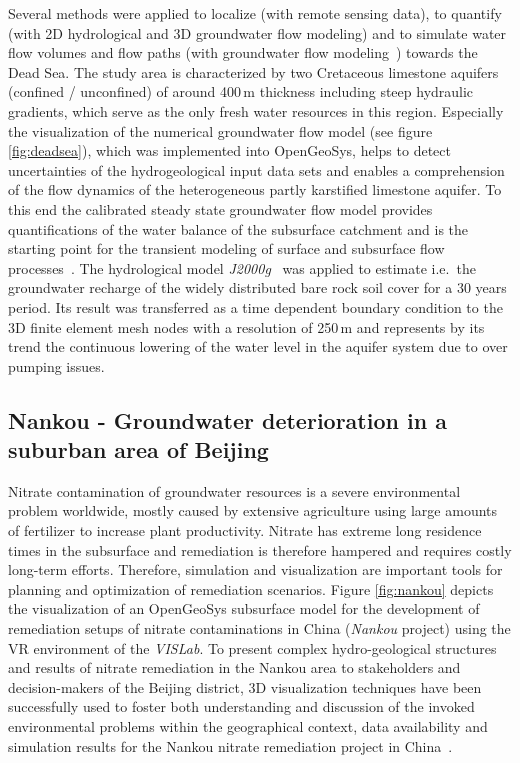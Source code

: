 \documentclass[twocolumn]{svjour3}          %
\begin{document}
Several methods were applied to localize (with remote sensing data), to quantify (with 2D hydrological and 3D groundwater flow modeling) and to simulate water flow volumes and flow paths (with groundwater flow modeling~\cite{graebe:modelcare}) towards the Dead Sea. The study area is characterized by two Cretaceous limestone aquifers (confined / unconfined) of around 400\,m thickness including steep hydraulic gradients, which serve as the only fresh water resources in this region. Especially the visualization of the numerical groundwater flow model (see figure \ref{fig:deadsea}), which was implemented into OpenGeoSys, helps to detect uncertainties of the hydrogeological input data sets and enables a comprehension of the flow dynamics of the heterogeneous partly karstified limestone aquifer. To this end the calibrated steady state groundwater flow model provides quantifications of the water balance of the subsurface catchment and is the starting point for the transient modeling of surface and subsurface flow processes~\cite{graebe:wessti}. The hydrological model \emph{J2000g}~\cite{KrauseKralisch:2005, Krause:2001} was applied to estimate i.e.~the groundwater recharge of the widely distributed bare rock soil cover for a 30 years period. Its result was transferred as a time dependent boundary condition to the 3D finite element mesh nodes with a resolution of 250\,m and represents by its trend the continuous lowering of the water level in the aquifer system due to over pumping issues.

\subsection{Nankou - Groundwater deterioration in a suburban area of Beijing}
\label{nankou}

Nitrate contamination of groundwater resources is a severe environmental problem worldwide, mostly caused by extensive agriculture using large amounts of fertilizer to increase plant productivity. Nitrate has extreme long residence times in the subsurface and remediation is therefore hampered and requires costly long-term efforts. Therefore, simulation and visualization are important tools for planning and optimization of remediation scenarios. Figure \ref{fig:nankou} depicts the visualization of an OpenGeoSys subsurface model for the development of remediation setups of nitrate contaminations in China (\emph{Nankou} project) using the VR environment of the \emph{VISLab}. To present complex hydro-geological structures and results of nitrate remediation in the Nankou area to stakeholders and decision-makers of the Beijing district, 3D visualization techniques have been successfully used to foster both understanding and discussion of the invoked environmental problems within the geographical context, data availability and simulation results for the Nankou nitrate remediation project in China~\cite{sun:ees}.
\end{document}
